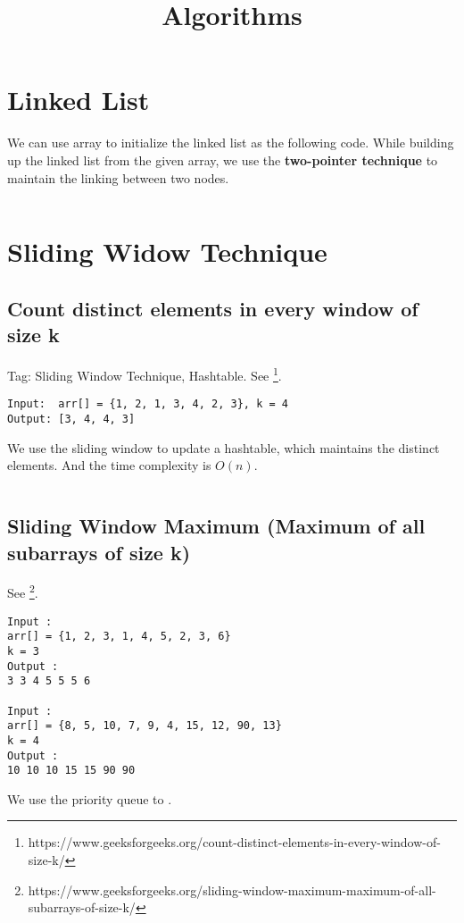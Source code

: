 \documentclass[11pt]{article}
\title{Algorithms}
\begin{document}
\maketitle

\section{Linked List}
We can use array to initialize the linked list as the following code.
While building up the linked list from the given array, we use the \textbf{two-pointer technique} to maintain the linking between two nodes.
\inputminted[breaklines=true,frame=leftline, linenos=true]{python}{src/linkedlist.py}

\section{Sliding Widow Technique}
\subsection{Count distinct elements in every window of size k}
Tag: Sliding Window Technique, Hashtable. 
See \footnote{https://www.geeksforgeeks.org/count-distinct-elements-in-every-window-of-size-k/}.

\begin{verbatim}
Input:  arr[] = {1, 2, 1, 3, 4, 2, 3}, k = 4
Output: [3, 4, 4, 3]
\end{verbatim}

We use the sliding window to update a hashtable, which maintains the distinct elements. And the time complexity is $O(n)$.

\inputminted{python}{src/distinct.py}

\subsection{Sliding Window Maximum (Maximum of all subarrays of size k)}

See \footnote{https://www.geeksforgeeks.org/sliding-window-maximum-maximum-of-all-subarrays-of-size-k/}.
\begin{verbatim}
Input :
arr[] = {1, 2, 3, 1, 4, 5, 2, 3, 6}
k = 3
Output :
3 3 4 5 5 5 6

Input :
arr[] = {8, 5, 10, 7, 9, 4, 15, 12, 90, 13}
k = 4
Output :
10 10 10 15 15 90 90
\end{verbatim}

We use the priority queue to .
\end{document}
